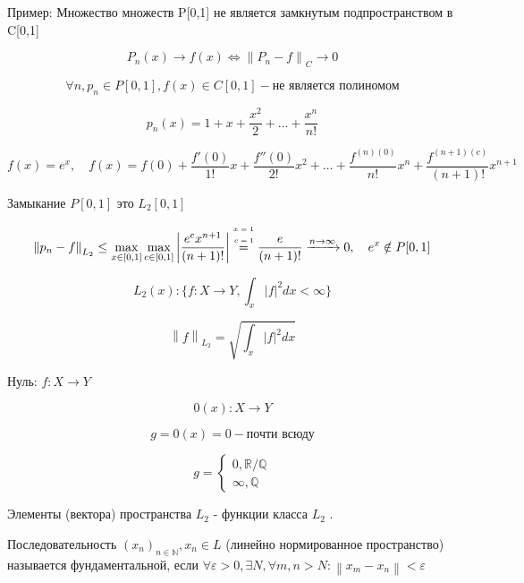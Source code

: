 \documentclass[12pt, a4paper]{report}
\begin{document}
\fi


Пример: Множество множеств P[0,1] не является замкнутым подпространством в C[0,1]

\[ P_n (x )  \to  f(x ) \Leftrightarrow  \left\lVert P_n - f  \right\rVert _C \to  0 \]

\[ \forall  n , p_n \in  P[0,1] , f(x ) \in  C[0,1] - \text{не является полиномом} \] 

\[ p_n(x) = 1+ x + \frac{x ^2 }{2 }  + \dots + \frac{x^n }{n!}  \] 

\[  f(x ) = e ^{x} , \quad f(x ) = f(0 ) +\frac{f'(0)}{1!}x+\frac{f''(0 )}{2!}x^2+\dots+ \frac{f^{(n )(0)} }{n ! }x^{n } + \frac{f^{(n+1 )(c)} }{(n+1)!} x^{n+1}     \] 

Замыкание \( P[0,1] \)  это \( L_2[0,1] \) 

\[ \left\lVert p_n -f  \right\rVert _{L_2}  \le  \max_{x \in [0,1]} \max_{c \in  [0,1]} \left\lvert \frac{e^c x^{n+1 } }{(n+1)!}  \right\rvert  \overset{\tiny\begin{aligned} x=1 \\c=1\end{aligned}}{=}\frac{e}{(n+1)!} \xrightarrow{n \to  \infty } 0 ,\quad e^x \notin P[0,1]       \] 



\[ L_2 (x ) :\{f: X \to  Y , \int_{x} |f| ^2 dx < \infty \} \] 

\[ \left\lVert f  \right\rVert _{L_2 } = \sqrt{\int_{x }|f| ^2 dx} \] 

Нуль: \( f : X \to  Y  \) 

\[  0(x ) : X \to  Y \] 

\[ g=0(x ) = 0 - \text{почти всюду}  \] 

\[ g = \begin{cases}
    0 , \mathbb{R}  /\mathbb{Q} \\
    \infty , \mathbb{Q}  
\end{cases} \] 


Элементы (вектора) пространства \( L_2    \)  - функции класса \( L_2  \) .

\begin{definition}
    Последовательность \( (x_n )_{n \in  \mathbb{N}} , x_n \in  L \) (линейно нормированное пространство) называется фундаментальной, если \( \forall  \varepsilon >0 , \exists N , \forall m,n >N : \left\lVert x_m - x_n  \right\rVert < \varepsilon \) 
\end{definition}
\end{document}
